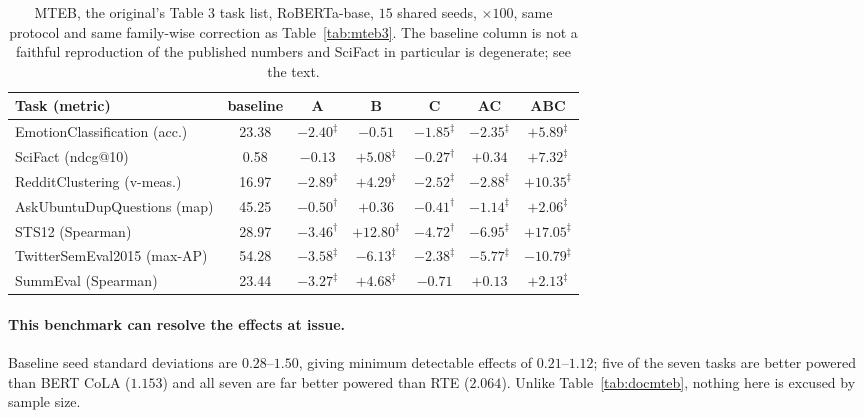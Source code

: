 \documentclass{article}
\begin{document}
\begin{table}[h]
\caption{MTEB, the original's Table 3 task list, RoBERTa-base, $15$ shared
seeds, $\times100$, same protocol and same family-wise correction as
Table~\ref{tab:mteb3}. The baseline column is not a faithful reproduction of
the published numbers and SciFact in particular is degenerate; see the text.}
\label{tab:mteb3rob}
\begin{center}
\footnotesize
\setlength{\tabcolsep}{4pt}
\begin{tabular}{lcccccc}
\toprule
Task (metric) & baseline & A & B & C & AC & ABC \\
\midrule
EmotionClassification (acc.)   & 23.38 & $-2.40^{\ddagger}$ & $-0.51$ & $-1.85^{\ddagger}$ & $-2.35^{\ddagger}$ & $+5.89^{\ddagger}$ \\
SciFact (ndcg@10)              & \phantom{0}0.58 & $-0.13$ & $+5.08^{\ddagger}$ & $-0.27^{\dagger}$ & $+0.34$ & $+7.32^{\ddagger}$ \\
RedditClustering (v-meas.)     & 16.97 & $-2.89^{\ddagger}$ & $+4.29^{\ddagger}$ & $-2.52^{\ddagger}$ & $-2.88^{\ddagger}$ & $\mathbf{+10.35}^{\ddagger}$ \\
AskUbuntuDupQuestions (map)    & 45.25 & $-0.50^{\dagger}$ & $+0.36$ & $-0.41^{\dagger}$ & $-1.14^{\ddagger}$ & $+2.06^{\ddagger}$ \\
STS12 (Spearman)               & 28.97 & $-3.46^{\dagger}$ & $+12.80^{\ddagger}$ & $-4.72^{\dagger}$ & $-6.95^{\ddagger}$ & $\mathbf{+17.05}^{\ddagger}$ \\
TwitterSemEval2015 (max-AP)    & 54.28 & $-3.58^{\ddagger}$ & $-6.13^{\ddagger}$ & $-2.38^{\ddagger}$ & $-5.77^{\ddagger}$ & $\mathbf{-10.79}^{\ddagger}$ \\
SummEval (Spearman)            & 23.44 & $-3.27^{\ddagger}$ & $+4.68^{\ddagger}$ & $-0.71$ & $+0.13$ & $+2.13^{\ddagger}$ \\
\bottomrule
\end{tabular}
\end{center}
\end{table}

\paragraph{This benchmark can resolve the effects at issue.} Baseline seed
standard deviations are $0.28$--$1.50$, giving minimum detectable effects of
$0.21$--$1.12$; five of the seven tasks are better powered than BERT CoLA
($1.153$) and all seven are far better powered than RTE ($2.064$). Unlike
Table~\ref{tab:docmteb}, nothing here is excused by sample size.
\end{document}
